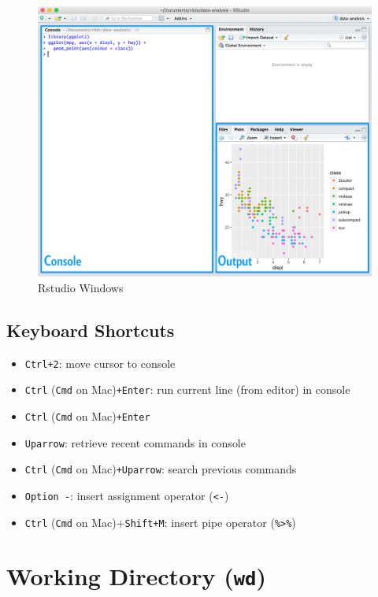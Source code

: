 \documentclass[]{book}
\providecommand{\tightlist}{%
  \setlength{\itemsep}{0pt}\setlength{\parskip}{0pt}}
\theoremstyle{definition}
\theoremstyle{definition}
\theoremstyle{definition}
\theoremstyle{remark}
\begin{document}
\begin{figure}
\centering
\includegraphics{images/rstudio.png}
\caption{Rstudio Windows}
\end{figure}

\subsection{Keyboard Shortcuts}\label{keyboard-shortcuts}

\begin{itemize}
\tightlist
\item
  \texttt{Ctrl+2}: move cursor to console
\item
  \texttt{Ctrl} (\texttt{Cmd} on Mac)\texttt{+Enter}: run current line
  (from editor) in console
\item
  \texttt{Ctrl} (\texttt{Cmd} on Mac)\texttt{+Enter}
\item
  \texttt{Uparrow}: retrieve recent commands in console
\item
  \texttt{Ctrl} (\texttt{Cmd} on Mac)\texttt{+Uparrow}: search previous
  commands
\item
  \texttt{Option\ -}: insert assignment operator (\texttt{\textless{}-})
\item
  \texttt{Ctrl} (\texttt{Cmd} on Mac)+\texttt{Shift+M}: insert pipe
  operator (\texttt{\%\textgreater{}\%})
\end{itemize}

\section{\texorpdfstring{Working Directory
(\texttt{wd})}{Working Directory (wd)}}\label{Working-directory}
\end{document}
